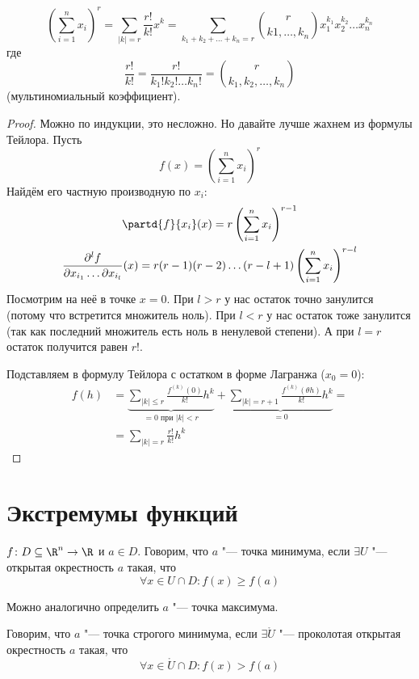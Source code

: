 \begin{theorem}
	\[ \left(\sum_{i=1}^n x_i\right)^r = \sum_{|k|=r} \frac{r!}{k!} x^k = \sum_{k_1+k_2+\dots+k_n=r}\binom{r}{k1, \dots, k_n} x_1^{k_1}x_2^{k_2}\dots x_n^{k_n}\]
	где
	\[ \frac{r!}{k!} = \frac{r!}{k_1!k_2!\dots k_n!} = \binom{r}{k_1, k_2, \dots, k_n}\]
	(мультиномиальный коэффициент).
\end{theorem}
\begin{proof}
	Можно по индукции, это несложно.
	Но давайте лучше жахнем из формулы Тейлора.
	Пусть
	\[ f(x)=\left( \sum_{i=1}^n x_i \right)^r \]
	Найдём его частную производную по $x_i$:
	\begin{gather*}
		\partd{f}{x_i} (x) = r \left( \sum_{i=1}^n x_i \right)^{r-1} \\
		\frac{\partial ^ l f}{\partial x_{i_1} \dots \partial x_{i_l}} (x) = r(r-1)(r-2)\dots(r-l+1) \left( \sum_{i=1}^n x_i \right)^{r-l} \\
	\end{gather*}	
	Посмотрим на неё в точке $x=0$.
	При $l>r$ у нас остаток точно занулится (потому что встретится множитель ноль).
	При $l<r$ у нас остаток тоже занулится (так как последний множитель есть ноль в ненулевой степени).
	А при $l=r$ остаток получится равен $r!$.

	Подставляем в формулу Тейлора с остатком в форме Лагранжа ($x_0=0$):
	\begin{align*}
		f(h) &= \underbrace{\sum_{|k| \le r} \frac{f^{(k)}(0)}{k!} h^k}_{=0\text{~при~}|k|<r} + \underbrace{\sum_{|k|=r+1} \frac{f^{(k)}(\theta h)}{k!} h^k}_{=0} = \\
			&= \sum_{|k|=r} \frac{r!}{k!} h^k
	\end{align*}
\end{proof}

\section{Экстремумы функций}
\begin{Def}
	$f \colon D \subseteq \R^n \to \R$ и $a \in D$.
	Говорим, что $a$ "--- точка минимума, если $\exists U$ "--- открытая окрестность $a$ такая, что
	\[ \forall x \in U \cap D \colon f(x) \ge f(a) \]
\end{Def}
\begin{Rem}
	Можно аналогично определить $a$ "--- точка максимума.
\end{Rem}
\begin{Def}
	Говорим, что $a$ "--- точка строгого минимума, если $\exists \mathring U$ "--- проколотая открытая окрестность $a$ такая, что
	\[ \forall x \in \mathring U \cap D \colon f(x) > f(a) \]
\end{Def}

